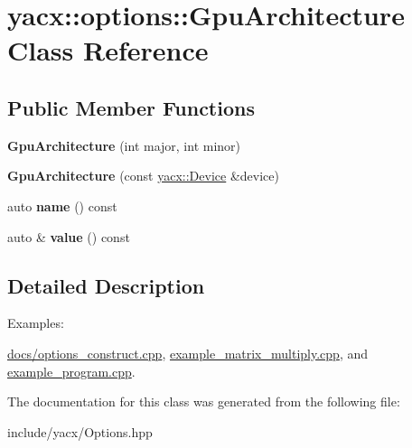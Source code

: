\hypertarget{classyacx_1_1options_1_1_gpu_architecture}{}\section{yacx\+:\+:options\+:\+:Gpu\+Architecture Class Reference}
\label{classyacx_1_1options_1_1_gpu_architecture}
\subsection*{Public Member Functions}
\begin{DoxyCompactItemize}
\item 
\mbox{\label{classyacx_1_1options_1_1_gpu_architecture_a0baff902e638ca1173b1dc54801ed22a}} 
{\bfseries Gpu\+Architecture} (int major, int minor)
\item 
\mbox{\label{classyacx_1_1options_1_1_gpu_architecture_a26c7ac5e84db61aa65563dcd29f376b2}} 
{\bfseries Gpu\+Architecture} (const \hyperlink{classyacx_1_1_device}{yacx\+::\+Device} \&device)
\item 
\mbox{\label{classyacx_1_1options_1_1_gpu_architecture_a2407cc1ae8526a89987a82b5dcc7dda6}} 
auto {\bfseries name} () const
\item 
\mbox{\label{classyacx_1_1options_1_1_gpu_architecture_aea50b543f6e12e9e32f9a977755269c7}} 
auto \& {\bfseries value} () const
\end{DoxyCompactItemize}


\subsection{Detailed Description}
\begin{Desc}
\item[Examples\+: ]\par
\hyperlink{docs_2options_construct_8cpp-example}{docs/options\+\_\+construct.\+cpp}, \hyperlink{example_matrix_multiply_8cpp-example}{example\+\_\+matrix\+\_\+multiply.\+cpp}, and \hyperlink{example_program_8cpp-example}{example\+\_\+program.\+cpp}.\end{Desc}


The documentation for this class was generated from the following file\+:\begin{DoxyCompactItemize}
\item 
include/yacx/Options.\+hpp\end{DoxyCompactItemize}
